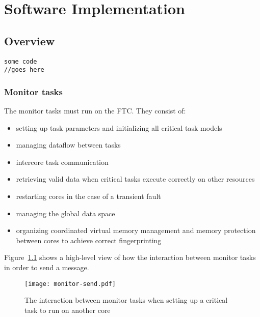 
\chapter{Software Implementation} %

\label{c:soft-impl} %


\section{Overview}
 

 
\begin{lstlisting}
some code
//goes here
\end{lstlisting}


\subsection{Monitor tasks}
The monitor tasks must run on the FTC. They consist of:
\begin{itemize}
  \item setting up task parameters and initializing all critical task models
  \item managing dataflow between tasks 
  \item intercore task communication 
  \item retrieving valid data when critical tasks execute correctly on other resources 
  \item restarting cores in the case of a transient fault
  \item managing the global data space
  \item organizing coordinated virtual memory management and memory protection between cores to achieve correct fingerprinting
\end{itemize} 

Figure~\ref{f:monitor-send} shows a high-level view of how the interaction between monitor tasks in order to send a message.

\begin{figure}
\centering
\texttt{[image: monitor-send.pdf]}
\caption{The interaction between monitor tasks when setting up a critical task to run on another core}
\label{f:monitor-send}
\end{figure}
